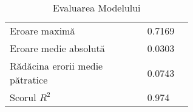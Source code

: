 \begin{table}[!htb]
    \centering
        \begin{tabular}{ | p{0.5\linewidth} | p{0.1\linewidth} | }
            \hline
            Eroare maximă & 0.7169 \\
            Eroare medie absolută & 0.0303 \\
            Rădăcina erorii medie pătratice & 0.0743 \\
            Scorul $ R^2 $ & 0.974 \\
            \hline
        \end{tabular}
    \caption{Evaluarea Modelului }
    \label{tab:pe_static_fast_malice_evaluation}
\end{table}